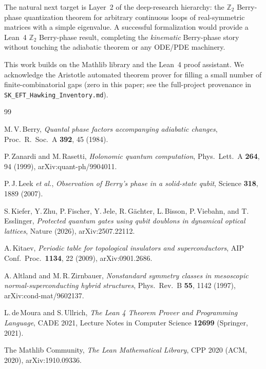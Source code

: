 \documentclass[aps,prd,twocolumn,showpacs,superscriptaddress,nofootinbib]{revtex4-2}
\begin{document}
The natural next target is Layer~2 of the deep-research hierarchy:
the $\mathbb{Z}_2$ Berry-phase quantization theorem for arbitrary
continuous loops of real-symmetric matrices with a simple eigenvalue.
A successful formalization would provide a Lean~4 $\mathbb{Z}_2$
Berry-phase result, completing the \emph{kinematic} Berry-phase story
without touching the adiabatic theorem or any ODE/PDE machinery.

\begin{acknowledgments}
This work builds on the Mathlib library and the Lean~4 proof
assistant. We acknowledge the Aristotle automated theorem prover
for filling a small number of finite-combinatorial gaps (zero in
this paper; see the full-project provenance in
\texttt{SK\_EFT\_Hawking\_Inventory.md}).
\end{acknowledgments}

\begin{thebibliography}{99}

 M.\,V.\,Berry,
\textit{Quantal phase factors accompanying adiabatic changes},
Proc.\ R.\ Soc.\ A \textbf{392}, 45 (1984).

 P.\,Zanardi and M.\,Rasetti,
\textit{Holonomic quantum computation},
Phys.\ Lett.\ A \textbf{264}, 94 (1999),
arXiv:quant-ph/9904011.

 P.\,J.\,Leek \textit{et al.},
\textit{Observation of Berry's phase in a solid-state qubit},
Science \textbf{318}, 1889 (2007).

 S.\,Kiefer, Y.\,Zhu, P.\,Fischer, Y.\,Jele,
R.\,G\"achter, L.\,Bisson, P.\,Viebahn, and T.\,Esslinger,
\textit{Protected quantum gates using qubit doublons in dynamical
optical lattices},
Nature (2026), arXiv:2507.22112.

 A.\,Kitaev,
\textit{Periodic table for topological insulators and superconductors},
AIP Conf.\ Proc.\ \textbf{1134}, 22 (2009), arXiv:0901.2686.

 A.\,Altland and M.\,R.\,Zirnbauer,
\textit{Nonstandard symmetry classes in mesoscopic normal-superconducting
hybrid structures},
Phys.\ Rev.\ B \textbf{55}, 1142 (1997),
arXiv:cond-mat/9602137.

 L.\,de\,Moura and S.\,Ullrich,
\textit{The Lean 4 Theorem Prover and Programming Language},
CADE 2021, Lecture Notes in Computer Science \textbf{12699}
(Springer, 2021).

 The Mathlib Community,
\textit{The Lean Mathematical Library},
CPP 2020 (ACM, 2020), arXiv:1910.09336.

\end{thebibliography}
\end{document}
